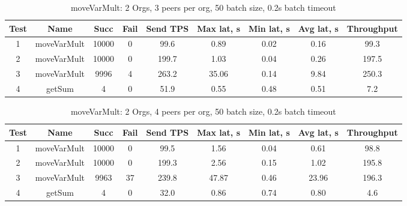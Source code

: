 \begin{appendices}
\begin{table}[h!]
\begin{center}
\begin{tabular}{ |c|c|c|c|c|c|c|c|c| }
 \hline
  Test & Name & Succ  & Fail & Send TPS & Max lat, s & Min lat, s & Avg lat, s & Throughput \\
 \hline
 \hline
 1    & moveVarMult & 10000 & 0    & 99.6  & 0.89      & 0.02      & 0.16      & 99.3   \\
 \hline
 2    & moveVarMult & 10000 & 0    & 199.7 & 1.03      & 0.04      & 0.26      & 197.5  \\
 \hline
 3    & moveVarMult & 9996  & 4    & 263.2 & 35.06     & 0.14      & 9.84      & 250.3  \\
 \hline
 4    & getSum      & 4     & 0    & 51.9  & 0.55      & 0.48      & 0.51      & 7.2    \\
 \hline
\end{tabular}
\end{center}
\caption{moveVarMult: 2 Orgs, 3 peers per org, 50 batch size, 0.2s batch timeout}
\end{table}

\begin{table}[h!]
\begin{center}
\begin{tabular}{ |c|c|c|c|c|c|c|c|c| }
 \hline
  Test & Name & Succ  & Fail & Send TPS & Max lat, s & Min lat, s & Avg lat, s & Throughput \\
 \hline
 \hline
 1    & moveVarMult & 10000 & 0    & 99.5  & 1.56      & 0.04      & 0.61      & 98.8   \\
 \hline
 2    & moveVarMult & 10000 & 0    & 199.3 & 2.56      & 0.15      & 1.02      & 195.8  \\
 \hline
 3    & moveVarMult & 9963  & 37   & 239.8 & 47.87     & 0.46      & 23.96     & 196.3  \\
 \hline
 4    & getSum      & 4     & 0    & 32.0  & 0.86      & 0.74      & 0.80      & 4.6    \\
 \hline
\end{tabular}
\end{center}
\caption{moveVarMult: 2 Orgs, 4 peers per org, 50 batch size, 0.2s batch timeout}
\end{table}


\end{appendices}
